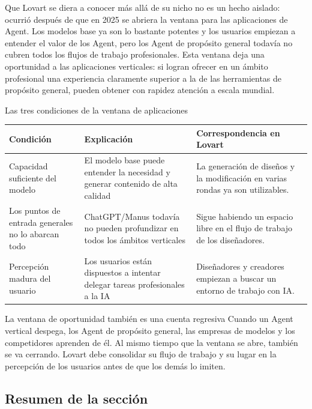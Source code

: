 \documentclass[a4paper]{article}
\begin{document}
Que Lovart se diera a conocer más allá de su nicho no es un hecho aislado: ocurrió después de que en 2025 se abriera la ventana para las aplicaciones de Agent. Los modelos base ya son lo bastante potentes y los usuarios empiezan a entender el valor de los Agent, pero los Agent de propósito general todavía no cubren todos los flujos de trabajo profesionales. Esta ventana deja una oportunidad a las aplicaciones verticales: si logran ofrecer en un ámbito profesional una experiencia claramente superior a la de las herramientas de propósito general, pueden obtener con rapidez atención a escala mundial.

\begin{knowledgebox}{Las tres condiciones de la ventana de aplicaciones}
\begin{tabularx}{\textwidth}{p{}p{}X}
\toprule
Condición & Explicación & Correspondencia en Lovart \\
\midrule
Capacidad suficiente del modelo & El modelo base puede entender la necesidad y generar contenido de alta calidad & La generación de diseños y la modificación en varias rondas ya son utilizables. \\
Los puntos de entrada generales no lo abarcan todo & ChatGPT/Manus todavía no pueden profundizar en todos los ámbitos verticales & Sigue habiendo un espacio libre en el flujo de trabajo de los diseñadores. \\
Percepción madura del usuario & Los usuarios están dispuestos a intentar delegar tareas profesionales a la IA & Diseñadores y creadores empiezan a buscar un entorno de trabajo con IA. \\
\bottomrule
\end{tabularx}
\end{knowledgebox}

\begin{warningbox}{La ventana de oportunidad también es una cuenta regresiva}
Cuando un Agent vertical despega, los Agent de propósito general, las empresas de modelos y los competidores aprenden de él. Al mismo tiempo que la ventana se abre, también se va cerrando. Lovart debe consolidar su flujo de trabajo y su lugar en la percepción de los usuarios antes de que los demás lo imiten.
\end{warningbox}

\subsection{Resumen de la sección}
\end{document}
